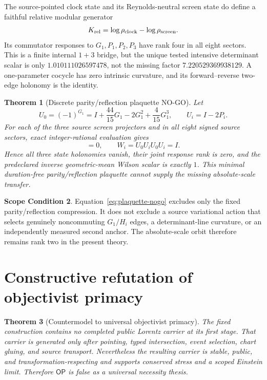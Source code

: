 \documentclass[11pt]{article}
\newtheorem{theorem}{Theorem}[section]
\theoremstyle{definition}
\newtheorem{scope}[theorem]{Scope Condition}
\theoremstyle{remark}
\newcommand{\OPT}{\mathsf{OP}}
\begin{document}
The source-pointed clock state and its Reynolds-neutral screen state do define
a faithful relative modular generator
\begin{equation}
K_{\rm rel}=\log\rho_{\rm clock}-\log\rho_{\rm screen}.
\end{equation}
Its commutator responses to $G_1,P_1,P_2,P_3$ have rank four in all eight
sectors. This is a finite internal $1+3$ bridge, but the unique tested
intensive determinant scalar is only
$1.010111026597478$, not the missing factor
$7.220529369938129$. A one-parameter cocycle has zero intrinsic curvature,
and its forward--reverse two-edge holonomy is the identity.

\begin{theorem}[Discrete parity/reflection plaquette NO-GO]
Let
\begin{equation}
U_0=(-1)^{G_1}
=I+\frac{44}{15}G_1-2G_1^2+\frac4{15}G_1^3,
\qquad U_i=I-2P_i.
\label{eq:discrete-involutions}
\end{equation}
For each of the three source screen projectors and in all eight signed source
sectors, exact integer-rational evaluation gives
\begin{equation}
[U_0,U_i]=0,\qquad W_i=U_0U_iU_0U_i=I.
\label{eq:plaquette-nogo}
\end{equation}
Hence all three state holonomies vanish, their joint response rank is zero,
and the predeclared inverse geometric-mean Wilson scalar is exactly $1$.
This minimal duration-free parity/reflection plaquette cannot supply the
missing absolute-scale transfer.
\end{theorem}

\begin{scope}
Equation~\eqref{eq:plaquette-nogo} excludes only the fixed
parity/reflection compression. It does not exclude a source variational action
that selects genuinely noncommuting $G_1/H_i$ edges, a determinant-line
curvature, or an independently measured second anchor. The absolute-scale
orbit therefore remains rank two in the present theory.
\end{scope}

\section{Constructive refutation of objectivist primacy}

\begin{theorem}[Countermodel to universal objectivist primacy]
The fixed construction contains no completed public Lorentz carrier at its first stage. That carrier is generated only after pointing, typed intersection, event selection, chart gluing, and source transport. Nevertheless the resulting carrier is stable, public, and transformation-respecting and supports conserved stress and a scoped Einstein limit. Therefore $\OPT$ is false as a universal necessity thesis.
\end{theorem}
\end{document}
